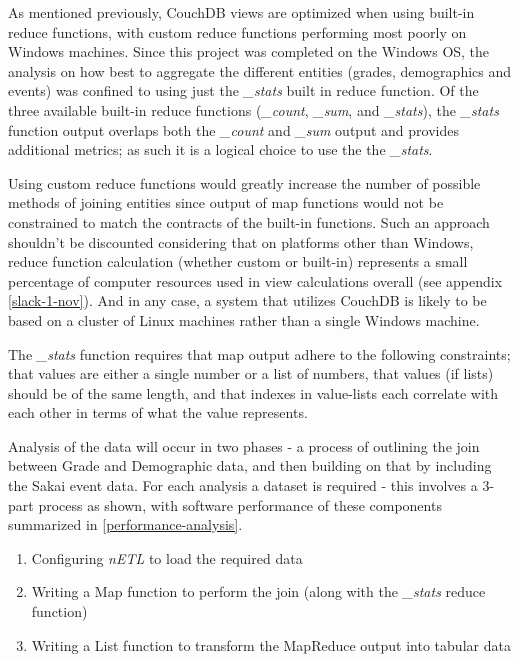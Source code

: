 As mentioned previously, CouchDB views are optimized when using built-in reduce functions, with custom reduce functions performing most poorly on Windows machines. Since this project was completed on the Windows OS, the analysis on how best to aggregate the different entities (grades, demographics and events) was confined to using just the \textit{\_stats} built in reduce function. Of the three available built-in reduce functions (\textit{\_count}, \textit{\_sum}, and \textit{\_stats}), the \textit{\_stats} function output overlaps both the \textit{\_count} and \textit{\_sum} output and provides additional metrics; as such it is a logical choice to use the the \textit{\_stats}.

Using custom reduce functions would greatly increase the number of possible methods of joining entities since output of map functions would not be constrained to match the contracts of the built-in functions. Such an approach shouldn't be discounted considering that on platforms other than Windows, reduce function calculation (whether custom or built-in) represents a small percentage of computer resources used in view calculations overall (see appendix \ref{slack-1-nov}). And in any case, a system that utilizes CouchDB is likely to be based on a cluster of Linux machines rather than a single Windows machine.

The \textit{\_stats} function requires that map output adhere to the following constraints; that values are either a single number or a list of numbers, that values (if lists) should be of the same length, and that indexes in value-lists each correlate with each other in terms of what the value represents.

Analysis of the data will occur in two phases - a process of outlining the join between Grade and Demographic data, and then building on that by including the Sakai event data. For each analysis a dataset is required - this involves a 3-part process as shown, with software performance of these components summarized in \ref{performance-analysis}.

\begin{enumerate}
    \item Configuring \textit{nETL} to load the required data
    \item Writing a Map function to perform the join (along with the \textit{\_stats} reduce function)
    \item Writing a List function to transform the MapReduce output into tabular data
\end{enumerate}



